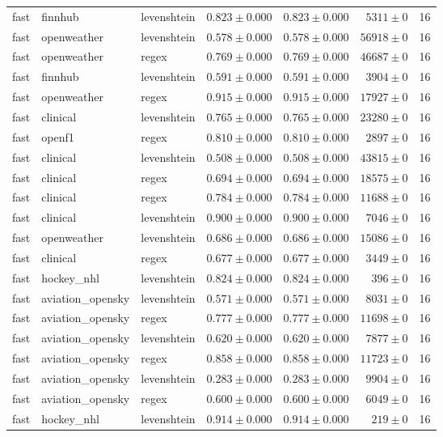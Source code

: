 \begin{table}[htbp]
\begin{tabular}{l l l r r r r}
fast & finnhub & levenshtein & $0.823\pm0.000$ & $0.823\pm0.000$ & $5311\pm0$ & 16 \\
fast & openweather & levenshtein & $0.578\pm0.000$ & $0.578\pm0.000$ & $56918\pm0$ & 16 \\
fast & openweather & regex & $0.769\pm0.000$ & $0.769\pm0.000$ & $46687\pm0$ & 16 \\
fast & finnhub & levenshtein & $0.591\pm0.000$ & $0.591\pm0.000$ & $3904\pm0$ & 16 \\
fast & openweather & regex & $0.915\pm0.000$ & $0.915\pm0.000$ & $17927\pm0$ & 16 \\
fast & clinical & levenshtein & $0.765\pm0.000$ & $0.765\pm0.000$ & $23280\pm0$ & 16 \\
fast & openf1 & regex & $0.810\pm0.000$ & $0.810\pm0.000$ & $2897\pm0$ & 16 \\
fast & clinical & levenshtein & $0.508\pm0.000$ & $0.508\pm0.000$ & $43815\pm0$ & 16 \\
fast & clinical & regex & $0.694\pm0.000$ & $0.694\pm0.000$ & $18575\pm0$ & 16 \\
fast & clinical & regex & $0.784\pm0.000$ & $0.784\pm0.000$ & $11688\pm0$ & 16 \\
fast & clinical & levenshtein & $0.900\pm0.000$ & $0.900\pm0.000$ & $7046\pm0$ & 16 \\
fast & openweather & levenshtein & $0.686\pm0.000$ & $0.686\pm0.000$ & $15086\pm0$ & 16 \\
fast & clinical & regex & $0.677\pm0.000$ & $0.677\pm0.000$ & $3449\pm0$ & 16 \\
fast & hockey\_nhl & levenshtein & $0.824\pm0.000$ & $0.824\pm0.000$ & $396\pm0$ & 16 \\
fast & aviation\_opensky & levenshtein & $0.571\pm0.000$ & $0.571\pm0.000$ & $8031\pm0$ & 16 \\
fast & aviation\_opensky & regex & $0.777\pm0.000$ & $0.777\pm0.000$ & $11698\pm0$ & 16 \\
fast & aviation\_opensky & levenshtein & $0.620\pm0.000$ & $0.620\pm0.000$ & $7877\pm0$ & 16 \\
fast & aviation\_opensky & regex & $0.858\pm0.000$ & $0.858\pm0.000$ & $11723\pm0$ & 16 \\
fast & aviation\_opensky & levenshtein & $0.283\pm0.000$ & $0.283\pm0.000$ & $9904\pm0$ & 16 \\
fast & aviation\_opensky & regex & $0.600\pm0.000$ & $0.600\pm0.000$ & $6049\pm0$ & 16 \\
fast & hockey\_nhl & levenshtein & $0.914\pm0.000$ & $0.914\pm0.000$ & $219\pm0$ & 16 \\

\end{tabular}
\end{table}

